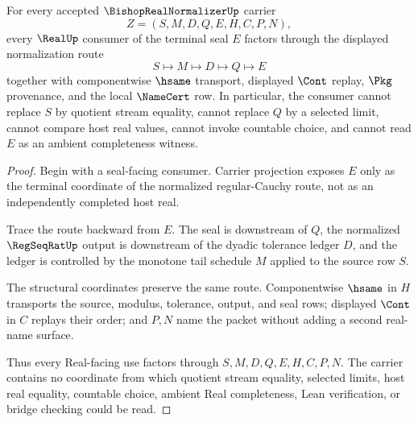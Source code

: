 \begin{theorem}
\label{thm:bishop-real-normalizer-real-seal-factorization}
For every accepted $\BishopRealNormalizerUp$ carrier
$$
Z=(S,M,D,Q,E,H,C,P,N),
$$
every $\RealUp$ consumer of the terminal seal $E$ factors through the displayed normalization route
$$
S\longmapsto M\longmapsto D\longmapsto Q\longmapsto E
$$
together with componentwise $\hsame$ transport, displayed $\Cont$ replay, $\Pkg$ provenance, and the local $\NameCert$ row. In particular, the consumer cannot replace $S$ by quotient stream equality, cannot replace $Q$ by a selected limit, cannot compare host real values, cannot invoke countable choice, and cannot read $E$ as an ambient completeness witness.
\end{theorem}
\begin{proof}
Begin with a seal-facing consumer. Carrier projection exposes $E$ only as the terminal coordinate of the normalized regular-Cauchy route, not as an independently completed host real.

Trace the route backward from $E$. The seal is downstream of $Q$, the normalized $\RegSeqRatUp$ output is downstream of the dyadic tolerance ledger $D$, and the ledger is controlled by the monotone tail schedule $M$ applied to the source row $S$.

The structural coordinates preserve the same route. Componentwise $\hsame$ in $H$ transports the source, modulus, tolerance, output, and seal rows; displayed $\Cont$ in $C$ replays their order; and $P,N$ name the packet without adding a second real-name surface.

Thus every Real-facing use factors through $S,M,D,Q,E,H,C,P,N$. The carrier contains no coordinate from which quotient stream equality, selected limits, host real equality, countable choice, ambient Real completeness, Lean verification, or bridge checking could be read.
\end{proof}



